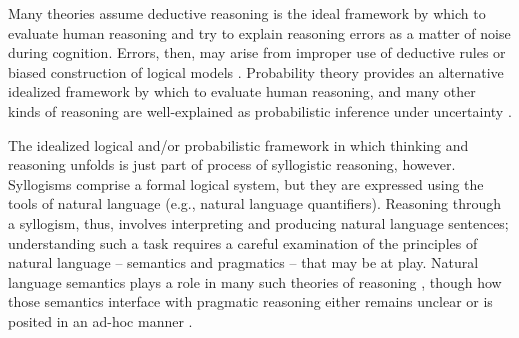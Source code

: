 \documentclass[floatsintext, doc]{apa6}
\newcommand{\mht}[1]{{\textcolor{Blue}{[mht: #1]}}}
\begin{document}



%
%
%




Many theories assume deductive reasoning is the ideal framework by which to evaluate human reasoning  and try to explain reasoning errors as a matter of noise during cognition. 
Errors, then, may arise from improper use of deductive rules \cite{rips1994, geurts2003reasoning} or biased construction of logical models \cite{JL1984, Newstead1992}. 
Probability theory provides an alternative idealized framework by which to evaluate human reasoning, and many other kinds of reasoning are well-explained as probabilistic inference under uncertainty \cite{tenenbaum2006theory}. 

The idealized logical and/or probabilistic framework in which thinking and reasoning unfolds is just part of process of syllogistic reasoning, however. 
Syllogisms comprise a formal logical system, but they are expressed using the tools of natural language (e.g., natural language quantifiers).
Reasoning through a syllogism, thus, involves interpreting and producing natural language sentences; understanding such a task requires a careful examination of the principles of natural language -- semantics and pragmatics -- that may be at play.
Natural language semantics plays a role in many such theories of reasoning \cite{JL1978, Khemlani2012, geurts2003reasoning}, though how those semantics interface with pragmatic reasoning either remains unclear \cite{Roberts2001} or is posited in an ad-hoc manner \cite{Chater1999}. 
\end{document}
